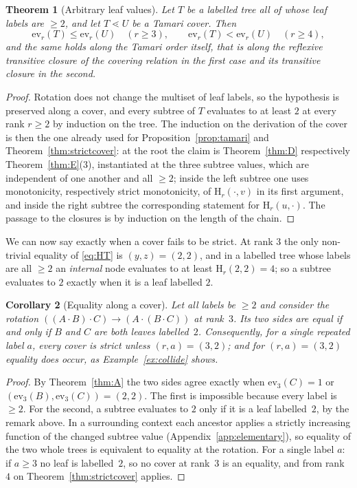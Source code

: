 \documentclass[11pt,a4paper]{article}
\theoremstyle{plain}
\newtheorem{theorem}{Theorem}[section]
\newtheorem{corollary}[theorem]{Corollary}
\theoremstyle{definition}
\newcommand{\HH}{\mathrm{H}}
\newcommand{\ev}{\mathrm{ev}}
\begin{document}
\begin{theorem}[Arbitrary leaf values]\label{thm:varleaf}
Let $T$ be a labelled tree all of whose leaf labels are $\ge2$, and let $T\lessdot U$
be a Tamari cover. Then
\[
  \ev_r(T)\le\ev_r(U)\quad(r\ge3),
  \qquad
  \ev_r(T)<\ev_r(U)\quad(r\ge4),
\]
and the same holds along the Tamari order itself, that is along the reflexive
transitive closure of the covering relation in the first case and its transitive
closure in the second.
\end{theorem}

\begin{proof}
Rotation does not change the multiset of leaf labels, so the hypothesis is preserved
along a cover, and every subtree of $T$ evaluates to at least $2$ at every rank
$r\ge2$ by induction on the tree. The induction on the derivation of the cover is then
the one already used for Proposition~\ref{prop:tamari} and
Theorem~\ref{thm:strictcover}: at the root the claim is Theorem~\ref{thm:D}
respectively Theorem~\ref{thm:E}(3), instantiated at the three subtree values, which
are independent of one another and all $\ge2$; inside the left subtree one uses
monotonicity, respectively strict monotonicity, of $\HH_r(\cdot,v)$ in its first
argument, and inside the right subtree the corresponding statement for
$\HH_r(u,\cdot)$. The passage to the closures is by induction on the length of the
chain.
\end{proof}

We can now say exactly when a cover fails to be strict. At rank $3$ the only
non-trivial equality of \eqref{eq:HT} is $(y,z)=(2,2)$, and in a labelled tree whose
labels are all $\ge2$ an \emph{internal} node evaluates to at least
$\HH_r(2,2)=4$; so a subtree evaluates to $2$ exactly when it is a leaf labelled $2$.

\begin{corollary}[Equality along a cover]\label{cor:coveq}
Let all labels be $\ge2$ and consider the rotation
$((A\!\cdot\!B)\!\cdot\!C)\to(A\!\cdot\!(B\!\cdot\!C))$ at rank~$3$. Its two sides are
equal if and only if $B$ and $C$ are both leaves labelled~$2$. Consequently, for a
single repeated label $a$, every cover is strict unless $(r,a)=(3,2)$; and for
$(r,a)=(3,2)$ equality does occur, as Example~\ref{ex:collide} shows.
\end{corollary}

\begin{proof}
By Theorem~\ref{thm:A} the two sides agree exactly when $\ev_3(C)=1$ or
$(\ev_3(B),\ev_3(C))=(2,2)$. The first is impossible because every label is $\ge2$. For the
second, a subtree evaluates to $2$ only if it is a leaf labelled~$2$, by the remark
above. In a surrounding context each ancestor applies a strictly increasing function of
the changed subtree value (Appendix~\ref{app:elementary}), so equality of the two whole
trees is equivalent to equality at the rotation. For a single label $a$: if $a\ge3$ no leaf is labelled~$2$, so no cover at
rank~$3$ is an equality, and from rank~$4$ on Theorem~\ref{thm:strictcover} applies.
\end{proof}
\end{document}
